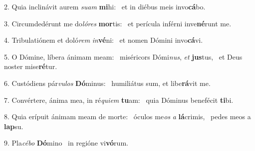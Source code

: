 2. Quia inclinávit aurem \textit{su}\textit{am} \textbf{mi}hi: \ast\  et in diébus meis invo\textbf{cá}bo.\

3. Circumdedérunt me do\textit{ló}\textit{res} \textbf{mor}tis: \ast\  et perícula inférni inve\textbf{né}runt me.\

4. Tribulatiónem et doló\textit{rem} \textit{in}\textbf{vé}ni: \ast\  et nomen Dómini invo\textbf{cá}vi.\

5. O Dómine, líbera ánimam meam: \dag\  miséricors Dómi\textit{nus}, \textit{et} \textbf{jus}tus, \ast\  et Deus noster mise\textbf{ré}tur.\

6. Custódiens pár\textit{vu}\textit{los} \textbf{Dó}minus: \ast\  humiliátus sum, et libe\textbf{rá}vit me.\

7. Convértere, ánima mea, in ré\textit{qui}\textit{em} \textbf{tu}am: \ast\  quia Dóminus benefécit \textbf{ti}bi.\

8. Quia erípuit ánimam meam de morte: \dag\  óculos me\textit{os} \textit{a} \textbf{lá}crimis, \ast\  pedes meos a \textbf{lap}su.\

9. Pla\textit{cé}\textit{bo} \textbf{Dó}mino \ast\  in regióne vi\textbf{vó}rum.\

